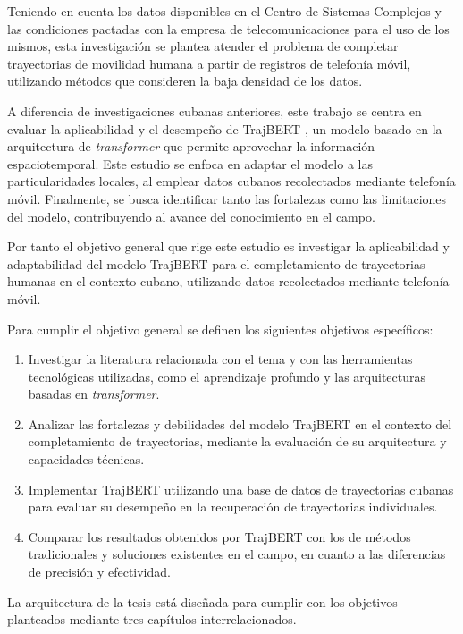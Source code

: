 Teniendo en cuenta los datos disponibles en el Centro de Sistemas Complejos y las condiciones pactadas con la empresa de telecomunicaciones para el uso de los mismos, esta investigación se plantea atender el problema de completar trayectorias de movilidad humana a partir de registros de telefonía móvil, utilizando métodos que consideren la baja densidad de los datos.

A diferencia de investigaciones cubanas anteriores, este trabajo se centra en evaluar la aplicabilidad y el desempeño de TrajBERT \cite{si2023trajbert}, un modelo basado en la arquitectura de \textit{transformer} \cite{vaswani2017attention} que permite aprovechar la información espaciotemporal. Este estudio se enfoca en adaptar el modelo a las particularidades locales, al emplear datos cubanos recolectados mediante telefonía móvil. Finalmente, se busca identificar tanto las fortalezas como las limitaciones del modelo, contribuyendo al avance del conocimiento en el campo.

Por tanto el objetivo general que rige este estudio es investigar la aplicabilidad y adaptabilidad del modelo TrajBERT para el completamiento de trayectorias humanas en el contexto cubano, utilizando datos recolectados mediante telefonía móvil.

Para cumplir el objetivo general se definen los siguientes objetivos específicos:

\begin{enumerate}
    \item Investigar la literatura relacionada con el tema y con las herramientas tecnológicas utilizadas, como el aprendizaje profundo y las arquitecturas basadas en \textit{transformer}. 
    \item Analizar las fortalezas y debilidades del modelo TrajBERT en el contexto del completamiento de trayectorias, mediante la evaluación de su arquitectura y capacidades técnicas.
    \item Implementar TrajBERT utilizando una base de datos de trayectorias cubanas para evaluar su desempeño en la recuperación de trayectorias individuales.
    \item Comparar los resultados obtenidos por TrajBERT con los de métodos tradicionales y soluciones existentes en el campo, en cuanto a las diferencias de precisión y efectividad.
\end{enumerate}

La arquitectura de la tesis está diseñada para cumplir con los objetivos planteados mediante tres capítulos interrelacionados. 

